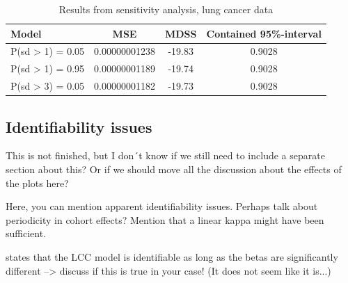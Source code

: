\begin{table}
    \begin{center}
        \begin{tabular}{l |c c c }
        Model & MSE &   MDSS & Contained 95\%-interval\\
        \hline
        P(sd > 1) = 0.05 & 0.00000001238 & -19.83    & 0.9028 \\
        P(sd > 1) = 0.95 & 0.00000001189 & -19.74    & 0.9028 \\
        P(sd > 3) = 0.05 & 0.00000001182 & -19.73    & 0.9028 \\
        \end{tabular}
    \caption{Results from sensitivity analysis, lung cancer data}\label{tbl:mv-sensitivity-lung}
    \end{center}
\end{table}

\newpage 
\subsection{Identifiability issues}
\textcolor{myDarkBlue}{This is not finished, but I don´t know if we still need to include a separate section about this? Or if we should move all the discussion about the effects of the plots here? }
\textcolor{myDarkGreen}{
Here, you can mention apparent identifiability issues. Perhaps talk about periodicity in cohort effects? Mention that a linear kappa might have been sufficient. 

\parencite{Wisniowski2015} states that the LCC model is identifiable as long as the betas are significantly different --> discuss if this is true in your case! (It does not seem like it is...)
}